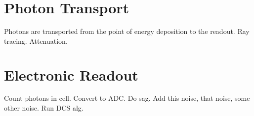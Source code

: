 \section{Photon Transport}

Photons are transported from the point of energy deposition to the  readout.  Ray tracing.  Attenuation.


\section{Electronic Readout}

Count photons in cell.  Convert to ADC.  Do sag.  Add this noise, that noise, some other noise.  Run DCS alg.



